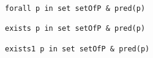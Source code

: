 \documentclass[10pt,landscape]{article}
\begin{document}
\begin{multicols}{2}
\begin{minipage}[c]{1\linewidth}
\begin{lstlisting}
forall p in set setOfP & pred(p)

exists p in set setOfP & pred(p)

exists1 p in set setOfP & pred(p)
\end{lstlisting}

\end{minipage}
\scriptsize




\end{multicols}
\end{document}
